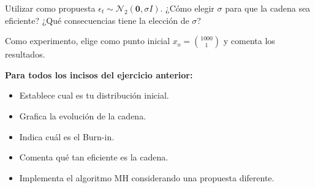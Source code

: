 \documentclass{article}
\begin{document}
\begin{enumerate}
Utilizar como propuesta $\epsilon_t \sim \mathcal N_2 (\mathbf0, \sigma I)$. ¿Cómo elegir $\sigma$ para que la cadena sea eficiente? ¿Qué consecuencias tiene la elección de $\sigma$?

Como experimento, elige como punto inicial $x_o = \binom{1000}{1}$ y comenta los resultados.

\textbf{Para todos los incisos del ejercicio anterior:}

\begin{itemize}
    \item Establece cual es tu distribución inicial.
    \item Grafica la evolución de la cadena.
    \item Indica cuál es el Burn-in.
    \item Comenta qué tan eficiente es la cadena.
    \item Implementa el algoritmo MH considerando una propuesta diferente.
\end{itemize}
   
\end{enumerate}





 
\end{document}
